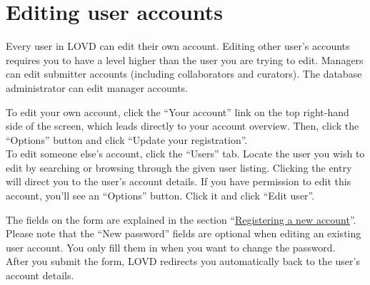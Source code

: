 \documentclass[a4paper,oneside,openany,12pt]{memoir}
\renewenvironment{leftbar}[1][\hsize]
{%
    \def\FrameCommand
    {%
        {\color{LOVDdark}\vrule width 3pt \hspace{5pt}}%
        \colorbox{LOVDlight}%
    }%
    \MakeFramed{\hsize#1\advance\hsize-\width\FrameRestore}%
}
{\endMakeFramed}
\begin{document}
\section{Editing user accounts}
Every user in LOVD can edit their own account.
Editing other user's accounts requires you to have a level higher than the user you are trying to edit.
Managers can edit submitter accounts (including collaborators and curators).
The database administrator can edit manager accounts.
\\
\par
To edit your own account, click the ``Your account'' link on the top right-hand side of the screen, which leads directly to your account overview.
Then, click the ``Options'' button and click ``Update your registration''.
\\
To edit someone else's account, click the ``Users'' tab.
Locate the user you wish to edit by searching or browsing through the given user listing.
Clicking the entry will direct you to the user's account details.
If you have permission to edit this account, you'll see an ``Options'' button.
Click it and click ``Edit user''.
\\
\par
The fields on the form are explained in the section ``\hyperlink{s_submitter_register}{Registering a new account}''.
Please note that the ``New password'' fields are optional when editing an existing user account.
You only fill them in when you want to change the password.
\\
After you submit the form, LOVD redirects you automatically back to the user's account details.
\end{document}
